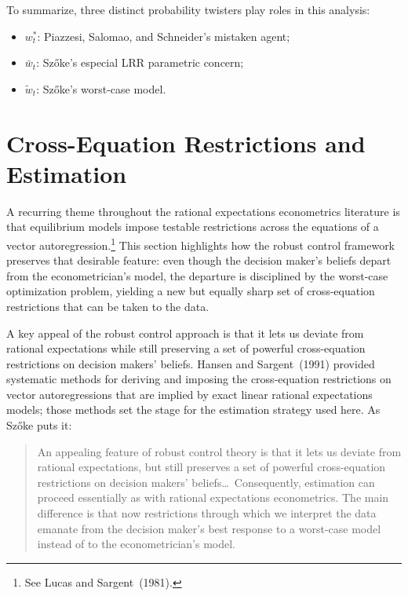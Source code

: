 \documentclass[12pt]{article}
\theoremstyle{definition}
\begin{document}
To summarize, three distinct probability twisters play roles in this
analysis:
\begin{itemize}
\item $w_t^*$: Piazzesi, Salomao, and Schneider's mistaken agent;
\item $\bar w_t$: Sz\H{o}ke's especial LRR parametric concern;
\item $\tilde w_t$: Sz\H{o}ke's worst-case model.
\end{itemize}


\section{Cross-Equation Restrictions and Estimation}
\label{sec:motivation}

A recurring theme throughout the rational expectations econometrics
literature is that equilibrium models impose testable restrictions across
the equations of a vector autoregression.\footnote{See Lucas and Sargent~(1981).}  
This section highlights how
the robust control framework preserves that desirable feature: even
though the decision maker's beliefs depart from the econometrician's
model, the departure is disciplined by the worst-case optimization
problem, yielding a new but equally sharp set of cross-equation
restrictions that can be taken to the data.

A key appeal of the robust control approach is that it lets us deviate
from rational expectations while still preserving a set of powerful
cross-equation restrictions on decision makers' beliefs.
Hansen and Sargent~(1991) provided systematic methods for deriving and
imposing the cross-equation restrictions on vector autoregressions that
are implied by exact linear rational expectations models; those methods
set the stage for the estimation strategy used here.
As Sz\H{o}ke puts it:
\begin{quote}
An appealing feature of robust control theory is that it lets us deviate
from rational expectations, but still preserves a set of powerful
cross-equation restrictions on decision makers' beliefs\ldots\
Consequently, estimation can proceed essentially as with rational
expectations econometrics.  The main difference is that now restrictions
through which we interpret the data emanate from the decision maker's
best response to a worst-case model instead of to the econometrician's
model.
\end{quote}
\end{document}

